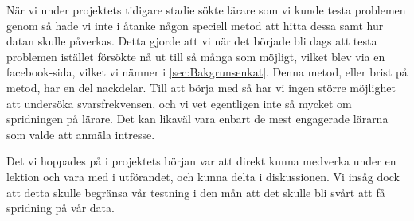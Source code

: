 
\textcolor{Mahogany}{När vi under projektets tidigare stadie sökte lärare som vi kunde testa problemen genom så hade vi inte i åtanke någon speciell metod att hitta dessa samt hur datan skulle påverkas. Detta gjorde att vi när det började bli dags att testa problemen istället försökte nå ut till så många som möjligt, vilket blev via en facebook-sida, vilket vi nämner i \ref{sec:Bakgrunsenkat}. Denna metod, eller brist på metod, har en del nackdelar. Till att börja med så har vi ingen större möjlighet att undersöka svarsfrekvensen, och vi vet egentligen inte så mycket om spridningen på lärare. Det kan likaväl vara enbart de mest engagerade lärarna som valde att anmäla intresse.}

\textcolor{Mahogany}{Det vi hoppades på i projektets början var att direkt kunna medverka under en lektion och vara med i utförandet, och kunna delta i diskussionen. Vi insåg dock att detta skulle begränsa vår testning i den mån att det skulle bli svårt att få spridning på vår data.}